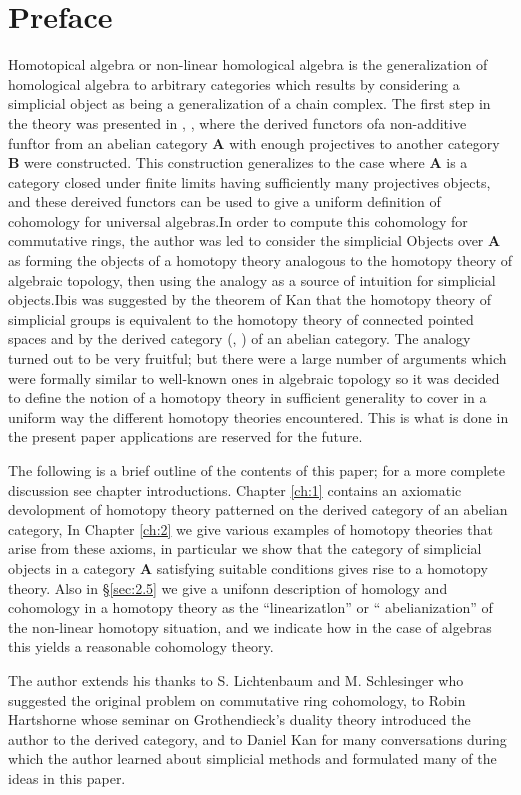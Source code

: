 \documentclass[../main]{subfiles}
\begin{document}
\chapter*{Preface}

Homotopical algebra or non-linear homological algebra is the
generalization of homological algebra to arbitrary categories
which results by considering a simplicial object as being a generalization of a chain complex. The first step in the theory was presented in \cite{dold_homology_1958}, \cite{dold_homologie_1961}, where the derived functors ofa  non-additive funftor from an abelian category $\mathbf{A}$ with enough projectives to another category $\mathbf{B}$ were constructed. This construction generalizes to the case where $\mathbf{A}$ is a category closed under finite limits having sufficiently many projectives objects, and these dereived functors can be used to give a uniform definition of cohomology for universal algebras.In order to compute this cohomology for commutative rings, the author was led to consider the
simplicial Objects over $\mathbf{A}$ as forming the objects of a homotopy
theory analogous to the homotopy theory of algebraic topology,
then using the analogy as a source of intuition for simplicial
objects.Ibis was suggested by the theorem of Kan \cite{kan_homotopy_1958} that the
homotopy theory of simplicial groups is equivalent to the homotopy theory of connected pointed spaces and by the derived category (\cite{hartshorne_residues_1966}, \cite{verdier_categories_nodate}) of an abelian category. The analogy turned out
to be very fruitful; but there were a large number of arguments which were formally similar to well-known ones in algebraic topology so it was decided to define the notion of a homotopy theory
in sufficient generality to cover in a uniform way the different
homotopy theories encountered. This is what is done in the present paper applications are reserved for the future. 

The following is a brief outline of the contents of this paper; for a more complete discussion see chapter introductions. Chapter \ref{ch:1} contains an axiomatic devolopment of homotopy theory patterned on the derived category of an abelian category, In Chapter \ref{ch:2} we
give various examples of homotopy theories that arise from these
axioms, in particular we show that the category of simplicial objects in a category $\mathbf{A}$ satisfying suitable conditions gives rise
to a homotopy theory. Also in \S\ref{sec:2.5} we give a unifonn description
of homology and cohomology in a homotopy theory as the ``linearizatlon'' or `` abelianization'' of the non-linear homotopy situation,
and we indicate how in the case of algebras this yields a reasonable cohomology theory.

The author extends his thanks to S. Lichtenbaum and
M. Schlesinger who suggested the original problem on commutative
ring cohomology, to Robin Hartshorne whose seminar \cite{hartshorne_residues_1966} on
Grothendieck's duality theory introduced the author to the derived
category, and to Daniel Kan for many conversations during which
the author learned about simplicial methods and formulated many
of the ideas in this paper.
\end{document}
